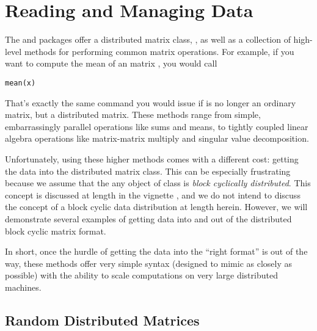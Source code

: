 \part{Reading and Managing Data}
\label{part:dmat}


The  and  packages offer a distributed matrix class, , as well as a collection of high-level methods for performing common matrix operations.  For example, if you want to compute the mean of an  matrix , you would call 
\begin{lstlisting}[language=rr]
mean(x)
\end{lstlisting}
That's exactly the same command you would issue if  is no longer an ordinary  matrix, but a distributed matrix.  These methods range from simple, embarrassingly parallel operations like sums and means, to tightly coupled linear algebra operations like matrix-matrix multiply and singular value decomposition.

Unfortunately, using these higher methods comes with a different cost:  getting the data into the distributed matrix class.  This can be especially frustrating because we assume that the any object of class  is \emph{block cyclically distributed}.  This concept is discussed at length in the  vignette \citep{Schmidt2012pbdBASEvignette}, and we do not intend to discuss the concept of a block cyclic data distribution at length herein.  However, we will demonstrate several examples of getting data into and out of the distributed block cyclic matrix format.

In short, once the hurdle of getting the data into the ``right format'' is out of the way, these methods offer very simple syntax (designed to mimic  as closely as possible) with the ability to scale computations on very large distributed machines.


\chapter{Random Distributed Matrices}
\label{sec:reader}

